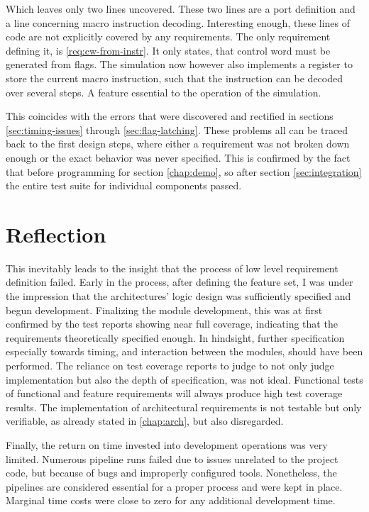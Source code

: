 Which leaves only two lines uncovered. These two lines are a port definition and a line concerning macro instruction decoding. Interesting enough, these lines of code are not explicitly covered by any requirements. The only requirement defining it, is \ref{req:cw-from-instr}. It only states, that control word must be generated from flags. The simulation now however also implements a register to store the current macro instruction, such that the instruction can be decoded over several steps. A feature essential to the operation of the simulation. 

This coincides with the errors that were discovered and rectified in sections \ref{sec:timing-issues} through \ref{sec:flag-latching}. These problems all can be traced back to the first design steps, where either a requirement was not broken down enough or the exact behavior was never specified. This is confirmed by the fact that before programming for section \ref{chap:demo}, so after section \ref{sec:integration} the entire test suite for individual components passed.

\section{Reflection}
This inevitably leads to the insight that the process of low level requirement definition failed. 
Early in the process, after defining the feature set, I was under the impression that the architectures' logic design was sufficiently specified and begun development. Finalizing the module development, this was at first confirmed by the test reports showing near full coverage, indicating that the requirements theoretically specified enough. In hindsight, further specification especially towards timing, and interaction between the modules, should have been performed. The reliance on test coverage reports to judge to not only judge implementation but also the depth of specification, was not ideal. Functional tests of functional and feature requirements will always produce high test coverage results. The implementation of architectural requirements is not testable but only verifiable, as already stated in \ref{chap:arch}, but also disregarded.

Finally, the return on time invested into development operations was very limited. Numerous pipeline runs failed due to issues unrelated to the project code, but because of bugs and improperly configured tools. Nonetheless, the pipelines are considered essential for a proper process and were kept in place. Marginal time costs were close to zero for any additional development time.

